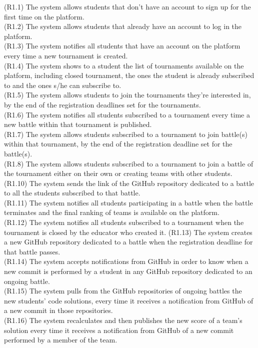 (R1.1) The system allows students that don't have an account to sign up for the first time on the platform.  \\
(R1.2) The system allows students that already have an account to log in the platform.\\
(R1.3) The system notifies all students that have an account on the platform every time a new tournament is created.\\
(R1.4) The system shows to a student the list of tournaments available on the platform, including closed tournament, the ones the student is already subscribed to and the ones s/he can subscribe to. \\
(R1.5) The system allows students to join the tournaments they’re interested in, by the end of the registration deadlines set for the tournaments.  \\
(R1.6) The system notifies all students subscribed to a tournament every time a new battle within that tournament is published.  \\
(R1.7) The system allows students subscribed to a tournament to join battle(s) within that tournament, by the end of the registration deadline set for the battle(s). \\
(R1.8) The system allows students subscribed to a tournament to join a battle of the tournament either on their own or creating teams with other students.  \\
(R1.10) The system sends the link of the GitHub repository dedicated to a battle to all the students subscribed to that battle. \\
(R1.11) The system notifies all students participating in a battle when the battle terminates and the final ranking of teams is available on the platform.  \\
(R1.12) The system notifies all students subscribed to a tournament when the tournament is closed by the educator who created it.
(R1.13) The system creates a new GitHub repository dedicated to a battle when the registration deadline for that battle passes. \\
(R1.14) The system accepts notifications from GitHub in order to know when a new commit is performed by a student in any GitHub repository dedicated to an ongoing battle.  \\
(R1.15) The system pulls from the GitHub repositories of ongoing battles the new students' code solutions, every time it receives a notification from GitHub of a new commit in those repositories.  \\
(R1.16) The system recalculates and then publishes the new score of a team's solution every time it receives a notification from GitHub of a new commit performed by a member of the team.  \\
